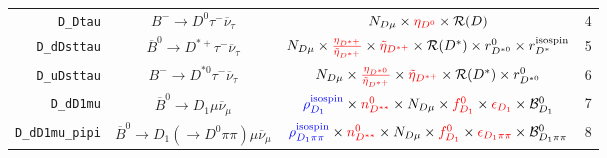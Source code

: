 \begin{landscape}
\begin{table}
\begin{tabular}{r|c|c|l}
         \texttt{D\_Dtau} &                   $B^- \rightarrow D^0 \tau^- \overline{\nu}_\tau$                   &                                                                                                                                                           $N_{D \mu} \times \textcolor{red}{\eta_{D^0}} \times \mathcal{R}(D)$                                                                                                                                                           & 4                \\
      \texttt{D\_dDsttau} &            $\overline{B}^0 \rightarrow D^{*+} \tau^- \overline{\nu}_\tau$            &                                                                                        $N_{D \mu} \times \textcolor{red}{\frac{\eta_{D^{*+}}}{\tilde{\eta}_{D^{*+}}}} \times \textcolor{red}{\tilde{\eta}_{D^{*+}}} \times \mathcal{R}(D^*) \times r_{D^{*0}}^{0} \times r_{D^*}^\text{isospin}$                                                                                         & 5                \\
      \texttt{D\_uDsttau} &                 $B^- \rightarrow D^{*0} \tau^- \overline{\nu}_\tau$                  &                                                                                                       $N_{D \mu} \times \textcolor{red}{\frac{\eta_{D^{*0}}}{\tilde{\eta}_{D^{*+}}}} \times \textcolor{red}{\tilde{\eta}_{D^{*+}}} \times \mathcal{R}(D^*) \times r_{D^{*0}}^{0}$                                                                                                        & 6                \\
        \texttt{D\_dD1mu} &               $\overline{B}^0 \rightarrow D_1 \mu \overline{\nu}_\mu$                &                                                                                      $\textcolor{blue}{\rho^\text{isospin}_{D_1}} \times \textcolor{red}{n^{0}_{D^{**}}} \times N_{D \mu} \times \textcolor{red}{f^{0}_{D_1}} \times \textcolor{red}{\epsilon_{D_1}} \times \mathcal{B}^{0}_{D_1}$                                                                                       & 7                \\
  \texttt{D\_dD1mu\_pipi} &   $\overline{B}^0 \rightarrow D_1 (\rightarrow D^0 \pi\pi) \mu \overline{\nu}_\mu$   &                                                                             $\textcolor{blue}{\rho^\text{isospin}_{D_1\pi\pi}} \times \textcolor{red}{n^{0}_{D^{**}}} \times N_{D \mu} \times \textcolor{red}{f^{0}_{D_1}} \times \textcolor{red}{\epsilon_{D_1\pi\pi}} \times \mathcal{B}^{0}_{D_1\pi\pi}$                                                                              & 8                \\

\end{tabular}
\end{table}
\end{landscape}
